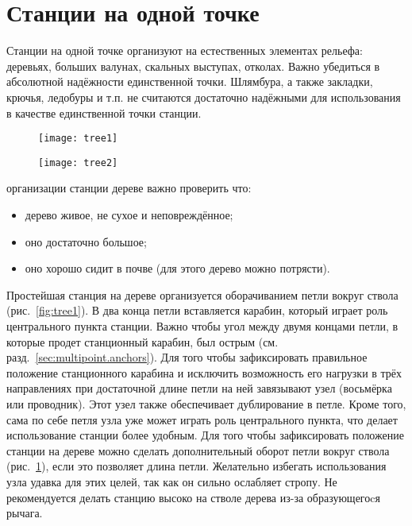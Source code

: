 \documentclass[fleqn, 12pt]{extarticle}
\begin{document}
\section{Станции на одной точке}
    Станции на одной точке организуют на естественных элементах рельефа: деревьях, больших валунах, скальных выступах, отколах. Важно убедиться в абсолютной надёжности единственной точки. 
    Шлямбура, а также закладки, крючья, ледобуры и т.п. не считаются достаточно надёжными для использования в качестве единственной точки станции.
    \begin{figure}[h]
        \centering
        \begin{minipage}[t]{0.45\textwidth}
            \texttt{[image: tree1]}
            \label{fig:tree1}
        \end{minipage}\hspace{0.05\textwidth}
        \begin{minipage}[t]{0.45\textwidth}
            \texttt{[image: tree2]}
            \label{fig:tree2}
        \end{minipage}
    \end{figure}

   	 организации станции дереве важно проверить что:
    \begin{itemize}
        \item дерево живое, не сухое и неповреждённое;
        \item оно достаточно большое;
        \item оно хорошо сидит в почве (для этого дерево можно потрясти).
    \end{itemize}
    
	Простейшая станция на дереве организуется оборачиванием петли вокруг ствола (рис.~\ref{fig:tree1}). В два конца петли вставляется карабин, который играет роль центрального пункта станции.
    Важно чтобы угол между двумя концами петли, в которые продет станционный карабин, был острым
    (см. разд.~\ref{sec:multipoint.anchors}). Для того чтобы зафиксировать правильное положение станционного карабина и исключить возможность его нагрузки в трёх направлениях 
    при достаточной длине петли на ней завязывают узел (восьмёрка или проводник). Этот узел также обеспечивает дублирование в петле. Кроме того, сама по себе  петля узла уже может играть 
	роль центрального пункта, что делает использование станции более удобным. Для того чтобы зафиксировать положение станции на дереве можно сделать дополнительный оборот петли
    вокруг ствола (рис.~\ref{fig:tree2}),
	если это позволяет длина петли. Желательно избегать использования узла удавка для этих целей, так как он сильно ослабляет стропу.
    Не рекомендуется делать станцию высоко на стволе дерева из-за образующегоcя рычага.
    
\end{document}

